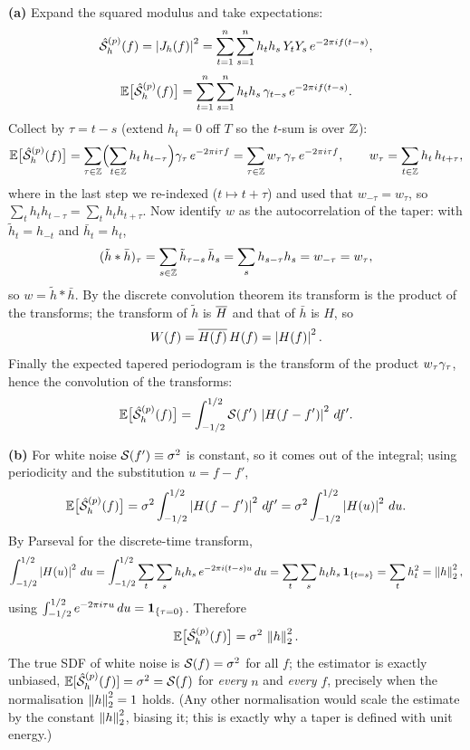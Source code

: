 \documentclass[11pt]{article}
\begin{document}
\textbf{(a)} Expand the squared modulus and take expectations:
\[
\hat{\mathcal{S}}^{(p)}_h(f)=\left\lvert J_h(f) \right\rvert^2
=\sum_{t=1}^{n}\sum_{s=1}^{n} h_t h_s\,Y_t Y_s\,e^{-2\pi i f(t-s)},
\]
\[
\mathbb{E}\bigl[\hat{\mathcal{S}}^{(p)}_h(f)\bigr]
=\sum_{t=1}^{n}\sum_{s=1}^{n} h_t h_s\,\gamma_{t-s}\,e^{-2\pi i f(t-s)}.
\]
Collect by $\tau=t-s$ (extend $h_t=0$ off $T$ so the $t$-sum is over $\mathbb{Z}$):
\[
\mathbb{E}\bigl[\hat{\mathcal{S}}^{(p)}_h(f)\bigr]
=\sum_{\tau\in\mathbb{Z}}\Bigl(\sum_{t\in\mathbb{Z}} h_t\,h_{t-\tau}\Bigr)\gamma_\tau\,e^{-2\pi i\tau f}
=\sum_{\tau\in\mathbb{Z}} w_\tau\,\gamma_\tau\,e^{-2\pi i\tau f},
\qquad
w_\tau=\sum_{t\in\mathbb{Z}} h_t\,h_{t+\tau},
\]
where in the last step we re-indexed ($t\mapsto t+\tau$) and used that $w_{-\tau}=w_\tau$, so $\sum_t h_t h_{t-\tau}=\sum_t h_t h_{t+\tau}$. Now identify $w$ as the autocorrelation of the taper: with $\tilde h_t=h_{-t}$ and $\bar h_t=h_t$,
\[
(\tilde h * \bar h)_\tau=\sum_{s\in\mathbb{Z}}\tilde h_{\tau-s}\,\bar h_s=\sum_{s}h_{s-\tau}h_s=w_{-\tau}=w_\tau,
\]
so $w=\tilde h * \bar h$. By the discrete convolution theorem its transform is the product of the transforms; the transform of $\tilde h$ is $\overline{H}$ and that of $\bar h$ is $H$, so
\[
W(f)=\overline{H(f)}\,H(f)=\left\lvert H(f) \right\rvert^2 .
\]
Finally the expected tapered periodogram is the transform of the product $w_\tau\gamma_\tau$, hence the convolution of the transforms:
\[
\mathbb{E}\bigl[\hat{\mathcal{S}}^{(p)}_h(f)\bigr]=\int_{-1/2}^{1/2}\mathcal{S}(f')\,\left\lvert H(f-f') \right\rvert^2\,df' .
\]

\textbf{(b)} For white noise $\mathcal{S}(f')\equiv\sigma^2$ is constant, so it comes out of the integral; using periodicity and the substitution $u=f-f'$,
\[
\mathbb{E}\bigl[\hat{\mathcal{S}}^{(p)}_h(f)\bigr]
=\sigma^2\int_{-1/2}^{1/2}\left\lvert H(f-f') \right\rvert^2\,df'
=\sigma^2\int_{-1/2}^{1/2}\left\lvert H(u) \right\rvert^2\,du .
\]
By Parseval for the discrete-time transform,
\[
\int_{-1/2}^{1/2}\left\lvert H(u) \right\rvert^2\,du
=\int_{-1/2}^{1/2}\sum_{t}\sum_{s}h_t h_s\,e^{-2\pi i(t-s)u}\,du
=\sum_{t}\sum_{s}h_t h_s\,\mathbf{1}_{\{t=s\}}
=\sum_{t} h_t^2=\left\lVert h \right\rVert_2^2,
\]
using $\int_{-1/2}^{1/2}e^{-2\pi i\tau u}\,du=\mathbf{1}_{\{\tau=0\}}$. Therefore
\[
\mathbb{E}\bigl[\hat{\mathcal{S}}^{(p)}_h(f)\bigr]=\sigma^2\,\left\lVert h \right\rVert_2^2 .
\]
The true SDF of white noise is $\mathcal{S}(f)=\sigma^2$ for all $f$; the estimator is exactly unbiased, $\mathbb{E}[\hat{\mathcal{S}}^{(p)}_h(f)]=\sigma^2=\mathcal{S}(f)$ for \emph{every} $n$ and \emph{every} $f$, precisely when the normalisation $\left\lVert h \right\rVert_2^2=1$ holds. (Any other normalisation would scale the estimate by the constant $\left\lVert h \right\rVert_2^2$, biasing it; this is exactly why a taper is defined with unit energy.)
\end{document}
